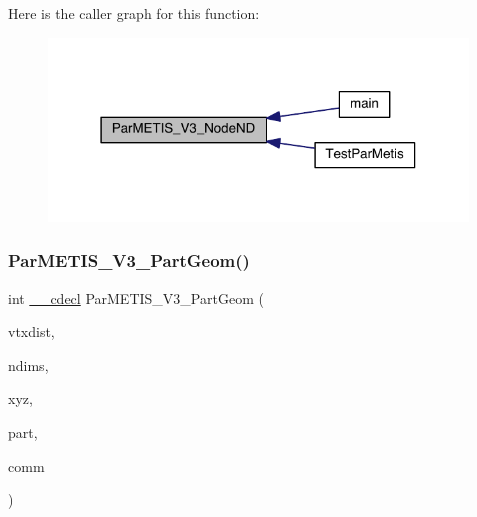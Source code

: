 Here is the caller graph for this function\+:\nopagebreak
\begin{figure}[H]
\begin{center}
\leavevmode
\includegraphics[width=316pt]{3rd_party_2parmetis-4_80_83_2include_2parmetis_8h_add23df29b4f232ac4c2cca94cc083a32_icgraph}
\end{center}
\end{figure}
\mbox{\label{3rd_party_2parmetis-4_80_83_2include_2parmetis_8h_aab31b6450a3228063206eddded9de65e}} 
\subsubsection{\texorpdfstring{Par\+M\+E\+T\+I\+S\+\_\+\+V3\+\_\+\+Part\+Geom()}{ParMETIS\_V3\_PartGeom()}}
{\footnotesize\ttfamily int \hyperlink{include_2parmetis_8h_a238347d7669f8f1e9c83bfe63a2730c4}{\+\_\+\+\_\+cdecl} Par\+M\+E\+T\+I\+S\+\_\+\+V3\+\_\+\+Part\+Geom (\begin{DoxyParamCaption}\item[{\hyperlink{3rd_party_2parmetis-4_80_83_2metis_2include_2metis_8h_aaa5262be3e700770163401acb0150f52}{idx\+\_\+t} $\ast$}]{vtxdist,  }\item[{\hyperlink{3rd_party_2parmetis-4_80_83_2metis_2include_2metis_8h_aaa5262be3e700770163401acb0150f52}{idx\+\_\+t} $\ast$}]{ndims,  }\item[{\hyperlink{3rd_party_2parmetis-4_80_83_2metis_2include_2metis_8h_a1924a4f6907cc3833213aba1f07fcbe9}{real\+\_\+t} $\ast$}]{xyz,  }\item[{\hyperlink{3rd_party_2parmetis-4_80_83_2metis_2include_2metis_8h_aaa5262be3e700770163401acb0150f52}{idx\+\_\+t} $\ast$}]{part,  }\item[{M\+P\+I\+\_\+\+Comm $\ast$}]{comm }\end{DoxyParamCaption})}


